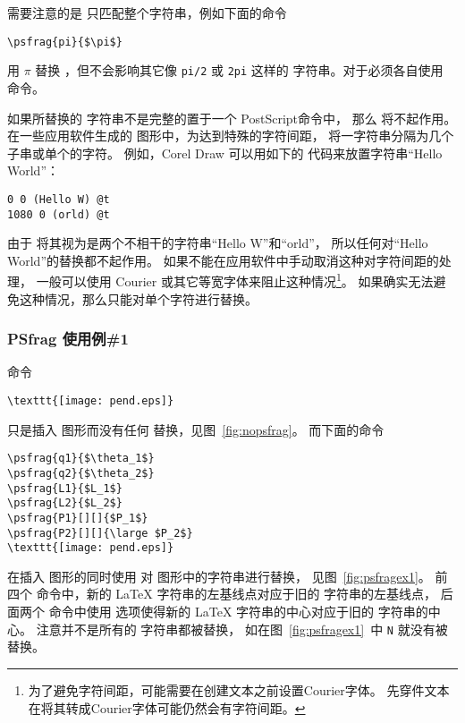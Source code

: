需要注意的是  只匹配整个字符串，例如下面的命令
\begin{lstlisting}
\psfrag{pi}{$\pi$}
\end{lstlisting}
用 $\pi$ 替换 ，但不会影响其它像 \texttt{pi/2} 或 \texttt{2pi} 这样的  字符串。对于必须各自使用  命令。

如果所替换的  字符串不是完整的置于一个 PostScript命令中，
那么  将不起作用。
在一些应用软件生成的  图形中，为达到特殊的字符间距，
将一字符串分隔为几个子串或单个的字符。
例如，Corel Draw 可以用如下的  代码来放置字符串“Hello World”：
\begin{Verbatim}[xleftmargin=1cm]
0 0 (Hello W) @t
1080 0 (orld) @t
\end{Verbatim}
由于  将其视为是两个不相干的字符串“Hello W”和“orld”，
所以任何对“Hello World”的替换都不起作用。
如果不能在应用软件中手动取消这种对字符间距的处理，
一般可以使用 Courier 或其它等宽字体来阻止这种情况\footnote{
	为了避免字符间距，可能需要在创建文本之前设置Courier字体。
	先穿件文本在将其转成Courier字体可能仍然会有字符间距。}。
如果确实无法避免这种情况，那么只能对单个字符进行替换。

\subsubsection{PSfrag 使用例\#1}\label{sssec:psfragex1}

命令
\begin{lstlisting}
\texttt{[image: pend.eps]}
\end{lstlisting}
只是插入  图形而没有任何  替换，见图~\ref{fig:nopsfrag}。
而下面的命令
\begin{lstlisting}
\psfrag{q1}{$\theta_1$}
\psfrag{q2}{$\theta_2$}
\psfrag{L1}{$L_1$}
\psfrag{L2}{$L_2$}
\psfrag{P1}[][]{$P_1$}
\psfrag{P2}[][]{\large $P_2$}
\texttt{[image: pend.eps]}
\end{lstlisting}
在插入  图形的同时使用  对  图形中的字符串进行替换，
见图~\ref{fig:psfragex1}。
前四个  命令中，新的 \LaTeX{} 字符串的左基线点对应于旧的  字符串的左基线点，
后面两个  命令中使用 \opt{[][]} 选项使得新的 \LaTeX{} 字符串的中心对应于旧的  字符串的中心。
注意并不是所有的  字符串都被替换，
如在图~\ref{fig:psfragex1}~中 \texttt{N} 就没有被替换。

